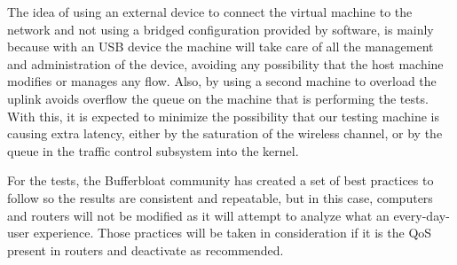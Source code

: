 The idea of using an external device to connect the virtual machine to the 
network and not using a bridged configuration provided by software, is mainly 
because with an USB device the machine will take care of all the management and 
administration of the device, avoiding any possibility that the host machine 
modifies or manages any flow. Also, by using a second machine to overload the 
uplink avoids overflow the queue on the machine that is performing 
the tests. With this, it is expected to minimize the possibility that our 
testing machine is causing extra latency, either by the saturation of the 
wireless channel, or by the queue in the traffic control subsystem into the 
kernel. 

For the tests, the Bufferbloat community\cite{bloat} has created a set of best 
practices\cite{tg12} to follow so the results are consistent and repeatable, 
but in this case, computers and routers will not be modified as it will attempt 
to analyze what an every-day-user experience. Those practices will be taken in 
consideration if it is the QoS present in routers and deactivate as recommended.
 
